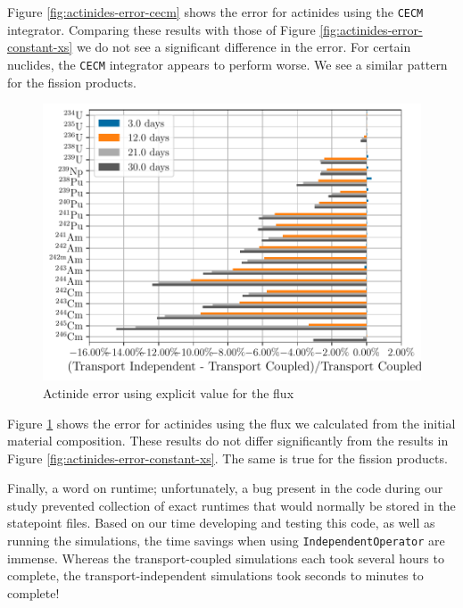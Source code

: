     Figure \ref{fig:actinides-error-cecm} shows the error for actinides using the
    \verb.CECM. integrator. Comparing these results with those of Figure
    \ref{fig:actinides-error-constant-xs} we do not see a significant difference
    in the error. For certain nuclides, the \verb.CECM. integrator appears to
    perform worse. We see a similar pattern for the fission products.

    \begin{figure}[htpb]
        \centering
        \includegraphics[width=\linewidth]{figs/actinides_constant_xs_predictor_source_rate_days.pdf}
        \caption{Actinide error using explicit value for the flux}
        \label{fig:actinides-error-source}
    \end{figure}

    Figure \ref{fig:actinides-error-source} shows the error for actinides using
    the flux we calculated from the initial material composition. These results
    do not differ significantly from the results in Figure
    \ref{fig:actinides-error-constant-xs}. The same is true for the fission
    products.

    Finally, a word on runtime; unfortunately, a bug present in the code during
    our study prevented collection of exact runtimes that would normally be
    stored in the statepoint files. Based on our time developing and testing
    this code, as well as running the simulations, the time savings when using
    \verb.IndependentOperator. are immense. Whereas the transport-coupled
    simulations each took several hours to complete, the transport-independent
    simulations took seconds to minutes to complete!


